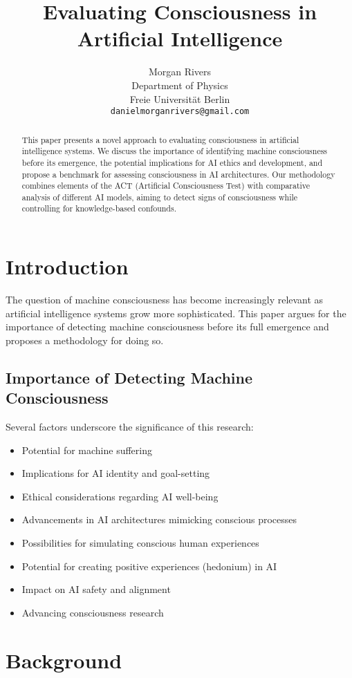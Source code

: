\documentclass{article}
\title{Evaluating Consciousness in Artificial Intelligence}
\author{Morgan Rivers \\
        Department of Physics \\
        Freie Universität Berlin \\    
        \texttt{danielmorganrivers@gmail.com}
}
\begin{document}
\maketitle

\begin{abstract}
This paper presents a novel approach to evaluating consciousness in artificial intelligence systems. We discuss the importance of identifying machine consciousness before its emergence, the potential implications for AI ethics and development, and propose a benchmark for assessing consciousness in AI architectures. Our methodology combines elements of the ACT (Artificial Consciousness Test) with comparative analysis of different AI models, aiming to detect signs of consciousness while controlling for knowledge-based confounds.
\end{abstract}

\section{Introduction}
The question of machine consciousness has become increasingly relevant as artificial intelligence systems grow more sophisticated. This paper argues for the importance of detecting machine consciousness before its full emergence and proposes a methodology for doing so.

\subsection{Importance of Detecting Machine Consciousness}
Several factors underscore the significance of this research:
\begin{itemize}
    \item Potential for machine suffering
    \item Implications for AI identity and goal-setting
    \item Ethical considerations regarding AI well-being
    \item Advancements in AI architectures mimicking conscious processes
    \item Possibilities for simulating conscious human experiences
    \item Potential for creating positive experiences (hedonium) in AI
    \item Impact on AI safety and alignment
    \item Advancing consciousness research
\end{itemize}

\section{Background}
\end{document}
